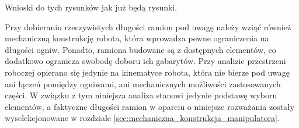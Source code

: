 \documentclass[printmode]{mgr}
\begin{document}
Wnioski do tych rysunków jak już będą rysunki.

Przy dobieraniu rzeczywistych długości ramion pod uwagę należy wziąć również mechaniczną konstrukcję robota, która
wprowadza pewne ograniczenia na długości ogniw. Ponadto, ramiona budowane są z dostępnych elementów, co dodatkowo ogranicza swobodę
doboru ich gabarytów. Przy analizie przestrzeni roboczej opierano się jedynie na kinematyce robota, która nie bierze
pod uwagę ani łączeń pomiędzy ogniwami, ani mechanicznych możliwości zastosowanych części. W związku z tym niniejsza analiza stanowi
jedynie podstawę wyboru elementów, a faktyczne długości ramion w oparciu o niniejsze rozważania zostały wyselekcjonowane w rozdziale
\ref{sec:mechaniczna_konstrukcja_manipulatora}.
%
%
%
%
\end{document}
